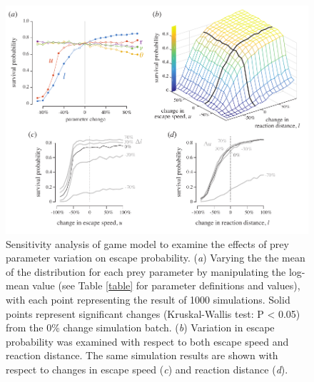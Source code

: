 \documentclass[]{rsos}%
\begin{document}
\begin{figure}[!h]
\centering
	\includegraphics[width=5.5in]{fig_sensitivity}
\caption{Sensitivity analysis of game model to examine the effects of prey parameter variation on escape probability. 
(\textit{a}) Varying the the mean of the distribution for each prey parameter by manipulating the log-mean value (see Table \ref{table} for parameter definitions and values), with each point representing the result of 1000 simulations. 
Solid points represent significant changes (Kruskal-Wallis test: P < 0.05) from the 0\% change simulation batch.
(\textit{b}) Variation in escape probability was examined with respect to both escape speed and reaction distance.
The same simulation results are shown with respect to changes in escape speed (\textit{c}) and reaction distance (\textit{d}).
}
\label{fig_sense}
\end{figure}

\pagebreak
\end{document}
